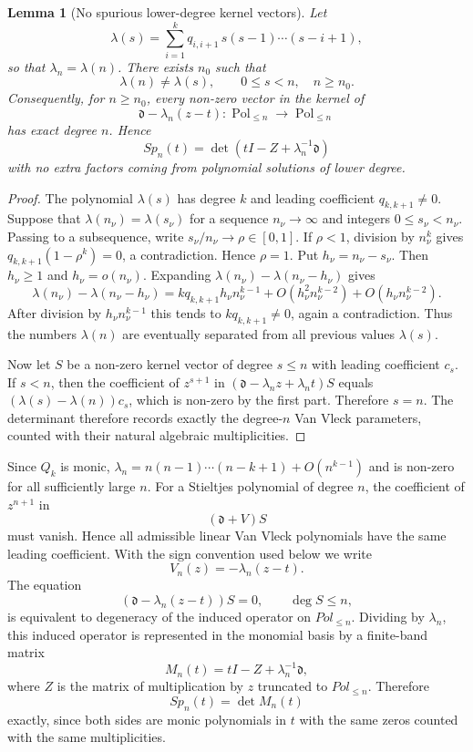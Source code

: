 \documentclass[10pt,twoside,a4paper,reqno]{amsart}
\theoremstyle{plain}
\newtheorem{lemm}           {Lemma}
\theoremstyle{definition}
\theoremstyle{remark}
\newenvironment{lemma}{\begin{lemm}}{\end{lemm}}
\newcommand {\dq}{\mathfrak d}
\begin{document}
\begin{lemma}[No spurious lower-degree kernel vectors]
\label{lem:no-spurious}
Let
\[
        \lambda(s)=\sum_{i=1}^{k}q_{i,i+1}\,s(s-1)\cdots(s-i+1),
\]
so that $\lambda_n=\lambda(n)$.  There exists $n_0$ such that
\[
        \lambda(n)\ne\lambda(s),\qquad 0\le s<n,\quad n\ge n_0 .
\]
Consequently, for $n\ge n_0$, every non-zero vector in the kernel of
\[
        \dq-\lambda_n(z-t):\operatorname{Pol}_{\le n}\longrightarrow
        \operatorname{Pol}_{\le n}
\]
has exact degree $n$.  Hence
\[
        Sp_n(t)=\det(tI-Z+\lambda_n^{-1}\dq)
\]
with no extra factors coming from polynomial solutions of lower degree.
\end{lemma}

\begin{proof}
The polynomial $\lambda(s)$ has degree $k$ and leading coefficient
$q_{k,k+1}\ne0$.  Suppose that $\lambda(n_\nu)=\lambda(s_\nu)$ for a sequence
$n_\nu\to\infty$ and integers $0\le s_\nu<n_\nu$.  Passing to a subsequence,
write $s_\nu/n_\nu\to\rho\in[0,1]$.  If $\rho<1$, division by $n_\nu^k$ gives
$q_{k,k+1}(1-\rho^k)=0$, a contradiction.  Hence $\rho=1$.  Put
$h_\nu=n_\nu-s_\nu$.  Then $h_\nu\ge1$ and $h_\nu=o(n_\nu)$.  Expanding
$\lambda(n_\nu)-\lambda(n_\nu-h_\nu)$ gives
\[
        \lambda(n_\nu)-\lambda(n_\nu-h_\nu)
        =kq_{k,k+1}h_\nu n_\nu^{k-1}
        +O(h_\nu^2 n_\nu^{k-2})+O(h_\nu n_\nu^{k-2}).
\]
After division by $h_\nu n_\nu^{k-1}$ this tends to $kq_{k,k+1}\ne0$, again a
contradiction.  Thus the numbers $\lambda(n)$ are eventually separated from all
previous values $\lambda(s)$.

Now let $S$ be a non-zero kernel vector of degree $s\le n$ with leading
coefficient $c_s$.  If $s<n$, then the coefficient of $z^{s+1}$ in
$(\dq-\lambda_n z+\lambda_n t)S$ equals $(\lambda(s)-\lambda(n))c_s$, which is
non-zero by the first part.  Therefore $s=n$.  The determinant therefore records
exactly the degree-$n$ Van Vleck parameters, counted with their natural algebraic
multiplicities.
\end{proof}
Since $Q_k$ is monic, $\lambda_n=n(n-1)\cdots(n-k+1)+O(n^{k-1})$ and is non-zero for all sufficiently large $n$.  For a Stieltjes polynomial of degree $n$, the coefficient of $z^{n+1}$ in
\[
\left(\dq+V\right)S
\]
must vanish. Hence all admissible linear Van Vleck polynomials have the same leading coefficient. With the sign convention used below we write
\[
V_n(z)=-\lambda_n(z-t).
\]
The equation
\[
(\dq-\lambda_n(z-t))S=0,
\qquad \deg S\le n,
\]
is equivalent to degeneracy of the induced operator on $Pol_{\le n}$. Dividing by $\lambda_n$, this induced operator is represented in the monomial basis by a finite-band matrix
\[
M_n(t)=tI-Z+\lambda_n^{-1}\dq,
\]
where $Z$ is the matrix of multiplication by $z$ truncated to $Pol_{\le n}$. Therefore
\[
Sp_n(t)=\det M_n(t)
\]
exactly, since both sides are monic polynomials in $t$ with the same zeros
counted with the same multiplicities.
\end{document}

